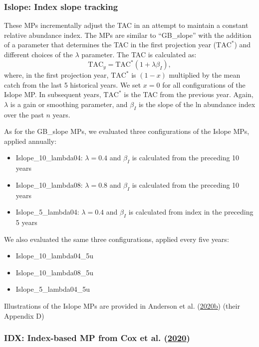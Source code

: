 \documentclass[11pt]{book}
\begin{document}
\hypertarget{sec:mp-islope-track}{%
\subsubsection{Islope: Index slope tracking}\label{sec:mp-islope-track}}

These MPs incrementally adjust the TAC in an attempt to maintain a constant relative abundance index. The MPs are similar to ``GB\_slope'' with the addition of a parameter that determines the TAC in the first projection year (\(\textrm{TAC}^*\)) and different choices of the \(\lambda\) parameter. The TAC is calculated as:
\begin{equation}
\textrm{TAC}_y = \textrm{TAC}^*(1+\lambda \beta_I),
\end{equation}
where, in the first projection year, \(\textrm{TAC}^*\) is \((1-x)\) multiplied by the mean catch from the last 5 historical years. We set \(x=0\) for all configurations of the Islope MP. In subsequent years, \(\textrm{TAC}^*\) is the TAC from the previous year. Again, \(\lambda\) is a gain or smoothing parameter, and \(\beta_I\) is the slope of the ln abundance index over the past \(n\) years.

As for the GB\_slope MPs, we evaluated three configurations of the Islope MPs, applied annually:
\begin{itemize}
\item
  Islope\_10\_lambda04: \(\lambda = 0.4\) and \(\beta_I\) is calculated from the preceding 10 years
\item
  Islope\_10\_lambda08: \(\lambda = 0.8\) and \(\beta_I\) is calculated from the preceding 10 years
\item
  Islope\_5\_lambda04: \(\lambda = 0.4\) and \(\beta_I\) is calculated from index in the preceding 5 years
\end{itemize}
We also evaluated the same three configurations, applied every five years:
\begin{itemize}
\item
  Islope\_10\_lambda04\_5u
\item
  Islope\_10\_lambda08\_5u
\item
  Islope\_5\_lambda04\_5u
\end{itemize}
Illustrations of the Islope MPs are provided in Anderson et al. (\protect\hyperlink{ref-anderson2020gfmp}{2020}\protect\hyperlink{ref-anderson2020gfmp}{b}) (their Appendix D)

\hypertarget{sec:mp-idx}{%
\subsubsection{\texorpdfstring{IDX: Index-based MP from Cox et al. (\protect\hyperlink{ref-cox2020}{2020})}{IDX: Index-based MP from Cox et al. (2020)}}\label{sec:mp-idx}}
\end{document}
